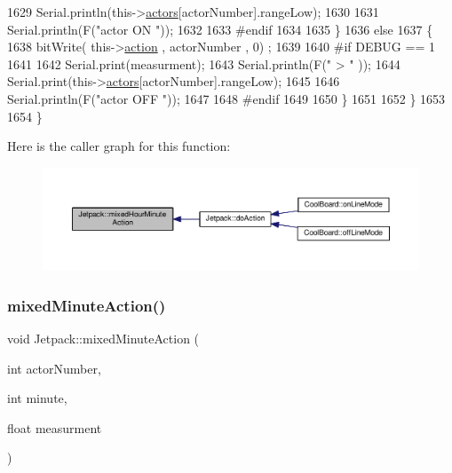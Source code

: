 \begin{DoxyCode}
1629             Serial.println(this->\hyperlink{class_jetpack_a7e16d2f97837f9712a2e6de1c50d99db}{actors}[actorNumber].rangeLow);
1630 
1631             Serial.println(F(\textcolor{stringliteral}{"actor ON "}));
1632 
1633 \textcolor{preprocessor}{        #endif  }
1634 
1635         \}
1636         \textcolor{keywordflow}{else} 
1637         \{
1638             bitWrite( this->\hyperlink{class_jetpack_aca3142925a7b0834b34ae91d26af7765}{action} , actorNumber , 0) ;
1639 
1640 \textcolor{preprocessor}{        #if DEBUG == 1 }
1641 
1642             Serial.print(measurment);
1643             Serial.println(F(\textcolor{stringliteral}{" > "} ));
1644             Serial.print(this->\hyperlink{class_jetpack_a7e16d2f97837f9712a2e6de1c50d99db}{actors}[actorNumber].rangeLow);
1645 
1646             Serial.println(F(\textcolor{stringliteral}{"actor OFF "}));
1647 
1648 \textcolor{preprocessor}{        #endif  }
1649             
1650         \}
1651     
1652     \}
1653 
1654 \}
\end{DoxyCode}
Here is the caller graph for this function\+:
\nopagebreak
\begin{figure}[H]
\begin{center}
\leavevmode
\includegraphics[width=350pt]{df/d1d/class_jetpack_a273dae1517b56f0242e28b8944edc26b_icgraph}
\end{center}
\end{figure}
\mbox{\label{class_jetpack_acf8ed1fb594b9e8e224f4ed872a8e093}} 
\subsubsection{\texorpdfstring{mixed\+Minute\+Action()}{mixedMinuteAction()}}
{\footnotesize\ttfamily void Jetpack\+::mixed\+Minute\+Action (\begin{DoxyParamCaption}\item[{int}]{actor\+Number,  }\item[{int}]{minute,  }\item[{float}]{measurment }\end{DoxyParamCaption})}

